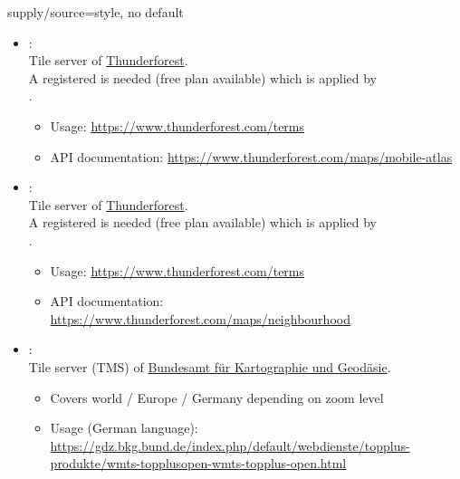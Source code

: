 \begin{docMrcKey}{supply/source}{=}{style, no default}
\begin{itemize}
  \item{}:\\
    Tile server of \href{https://www.thunderforest.com}{Thunderforest}.\\
    A registered  is needed (free plan available)
    which is applied by\\
    .
    \begin{itemize}
    \item Usage: \url{https://www.thunderforest.com/terms}
    \item API documentation: \url{https://www.thunderforest.com/maps/mobile-atlas}
    \end{itemize}

  \item{}:\\
    Tile server of \href{https://www.thunderforest.com}{Thunderforest}.\\
    A registered  is needed (free plan available)
    which is applied by\\
    .
    \begin{itemize}
    \item Usage: \url{https://www.thunderforest.com/terms}
    \item API documentation: \url{https://www.thunderforest.com/maps/neighbourhood}
    \end{itemize}

\clearpage
  \item{}:\\
    Tile server (TMS) of \href{http://www.bkg.bund.de}{Bundesamt f\"{u}r Kartographie und Geod\"{a}sie}.
    \begin{itemize}
    \item Covers world / Europe / Germany depending on zoom level
    \item Usage (German language): \url{https://gdz.bkg.bund.de/index.php/default/webdienste/topplus-produkte/wmts-topplusopen-wmts-topplus-open.html}
    \end{itemize}


\end{itemize}
\end{docMrcKey}
